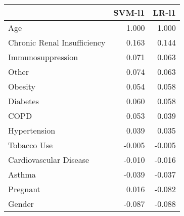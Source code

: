 \begin{tabular}{lrr}
\toprule
{} &  SVM-l1 &  LR-l1 \\
\midrule
Age                         &   1.000 &  1.000 \\
Chronic Renal Insufficiency &   0.163 &  0.144 \\
Immunosuppression           &   0.071 &  0.063 \\
Other                       &   0.074 &  0.063 \\
Obesity                     &   0.054 &  0.058 \\
Diabetes                    &   0.060 &  0.058 \\
COPD                        &   0.053 &  0.039 \\
Hypertension                &   0.039 &  0.035 \\
Tobacco Use                 &  -0.005 & -0.005 \\
Cardiovascular Disease      &  -0.010 & -0.016 \\
Asthma                      &  -0.039 & -0.037 \\
Pregnant                    &   0.016 & -0.082 \\
Gender                      &  -0.087 & -0.088 \\
\bottomrule
\end{tabular}
